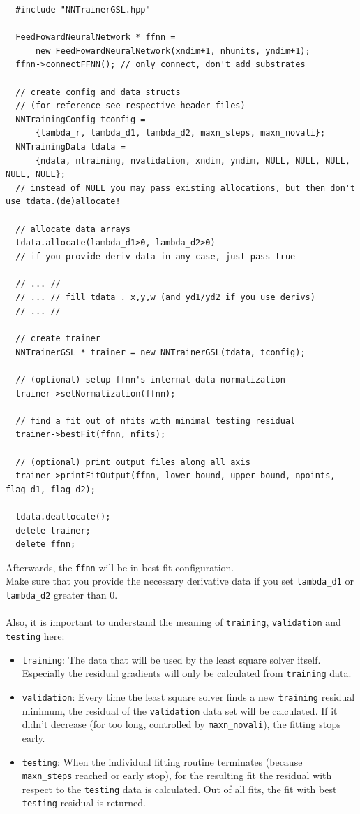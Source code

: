 \documentclass[11pt,a4paper,twoside]{article}
\begin{document}
\begin{lstlisting}
  #include "NNTrainerGSL.hpp"

  FeedFowardNeuralNetwork * ffnn =
      new FeedFowardNeuralNetwork(xndim+1, nhunits, yndim+1);
  ffnn->connectFFNN(); // only connect, don't add substrates

  // create config and data structs
  // (for reference see respective header files)
  NNTrainingConfig tconfig =
      {lambda_r, lambda_d1, lambda_d2, maxn_steps, maxn_novali};
  NNTrainingData tdata =
      {ndata, ntraining, nvalidation, xndim, yndim, NULL, NULL, NULL, NULL, NULL};
  // instead of NULL you may pass existing allocations, but then don't use tdata.(de)allocate!  

  // allocate data arrays
  tdata.allocate(lambda_d1>0, lambda_d2>0)
  // if you provide deriv data in any case, just pass true

  // ... //
  // ... // fill tdata . x,y,w (and yd1/yd2 if you use derivs)
  // ... //

  // create trainer
  NNTrainerGSL * trainer = new NNTrainerGSL(tdata, tconfig);

  // (optional) setup ffnn's internal data normalization
  trainer->setNormalization(ffnn);

  // find a fit out of nfits with minimal testing residual
  trainer->bestFit(ffnn, nfits);

  // (optional) print output files along all axis
  trainer->printFitOutput(ffnn, lower_bound, upper_bound, npoints, flag_d1, flag_d2);

  tdata.deallocate();
  delete trainer;
  delete ffnn;

\end{lstlisting}
Afterwards, the \verb+ffnn+ will be in best fit configuration.
\\Make sure that you provide the necessary derivative data if you set
\verb+lambda_d1+ or \verb+lambda_d2+ greater than 0.
\\\\Also, it is important to understand the meaning of \verb+training+, \verb+validation+ and \verb+testing+
here:
\begin{itemize}
\item \verb+training+: The data that will be used by the least square solver itself.
  Especially the residual gradients will only be calculated from \verb+training+ data.
\item \verb+validation+: Every time the least square solver finds a new \verb+training+
  residual minimum, the residual of the \verb+validation+ data set will be calculated. If
  it didn't decrease (for too long, controlled by \verb+maxn_novali+), the
  fitting stops early.
\item \verb+testing+: When the individual fitting routine terminates (because
  \\\verb+maxn_steps+ reached or early stop), for the resulting fit the residual with
  respect to the \verb+testing+ data is calculated. Out of all fits, the fit with best
  \verb+testing+ residual is returned.
\end{itemize}
\end{document}
